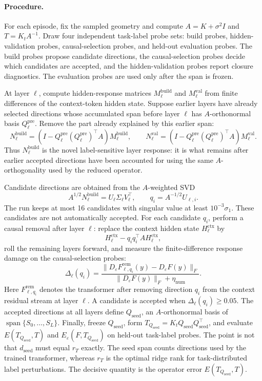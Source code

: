 \documentclass[11pt]{article}
\newcommand{\spanop}{\operatorname{span}}
\begin{document}
\paragraph{Procedure.}
For each episode, fix the sampled geometry and compute \(A=K+\sigma^2I\) and \(T=K_tA^{-1}\).
Draw four independent task-label probe sets: build probes, hidden-validation probes,
causal-selection probes, and held-out evaluation probes. The build probes propose candidate
directions, the causal-selection probes decide which candidates are accepted, and the
hidden-validation probes report closure diagnostics. The evaluation probes are used only after the
span is frozen.

At layer \(\ell\), compute hidden-response matrices \(M_\ell^{\mathrm{build}}\) and \(M_\ell^{\mathrm{val}}\)
from finite differences of the context-token hidden state. Suppose earlier layers have already
selected directions whose accumulated span before layer \(\ell\) has \(A\)-orthonormal basis
\(Q_\ell^{\mathrm{pre}}\). Remove the part already explained by this earlier span:
\[
N_\ell^{\mathrm{build}}
=
\left(I-Q_\ell^{\mathrm{pre}}(Q_\ell^{\mathrm{pre}})^\top A\right)M_\ell^{\mathrm{build}},
\qquad
N_\ell^{\mathrm{val}}
=
\left(I-Q_\ell^{\mathrm{pre}}(Q_\ell^{\mathrm{pre}})^\top A\right)M_\ell^{\mathrm{val}}.
\]
Thus \(N_\ell^{\mathrm{build}}\) is the novel label-sensitive layer response: it is what remains after
earlier accepted directions have been accounted for using the same \(A\)-orthogonality used by the
reduced operator.

Candidate directions are obtained from the \(A\)-weighted SVD
\[
A^{1/2}N_\ell^{\mathrm{build}}=U_\ell\Sigma_\ell V_\ell^\top,
\qquad
q_i=A^{-1/2}U_{\ell,i}.
\]
The run keeps at most 16 candidates with singular value at least \(10^{-3}\sigma_1\). These
candidates are not automatically accepted. For each candidate \(q_i\), perform a causal removal
after layer \(\ell\): replace the context hidden state \(H_\ell^{\mathrm{ctx}}\) by
\[
H_\ell^{\mathrm{ctx}}
-
q_iq_i^\top AH_\ell^{\mathrm{ctx}},
\]
roll the remaining layers forward, and measure the finite-difference response damage on the
causal-selection probes:
\[
\Delta_\ell(q_i)
=
\frac{
\|D_\varepsilon F_{\ell,q_i}^{\mathrm{rem}}(y)-D_\varepsilon F(y)\|_F
}{
\|D_\varepsilon F(y)\|_F+\eta_{\mathrm{num}}
}.
\]
Here \(F_{\ell,q_i}^{\mathrm{rem}}\) denotes the transformer after removing direction \(q_i\) from the
context residual stream at layer \(\ell\). A candidate is accepted when \(\Delta_\ell(q_i)\ge 0.05\).
The accepted directions at all layers define \(Q_{\mathrm{seed}}\), an \(A\)-orthonormal basis of
\(\spanop\{S_0,\ldots,S_L\}\). Finally, freeze \(Q_{\mathrm{seed}}\), form
\(T_{Q_{\mathrm{seed}}}=K_tQ_{\mathrm{seed}}Q_{\mathrm{seed}}^\top\), and evaluate
\(E(T_{Q_{\mathrm{seed}}},T)\) and \(E_\varepsilon(F,T_{Q_{\mathrm{seed}}})\) on held-out task-label probes.
The point is not that \(d_{\mathrm{seed}}\) must equal \(r_T\) exactly. The seed span counts directions
used by the trained transformer, whereas \(r_T\) is the optimal ridge rank for task-distributed label
perturbations. The decisive quantity is the operator error \(E(T_{Q_{\mathrm{seed}}},T)\).
\end{document}
